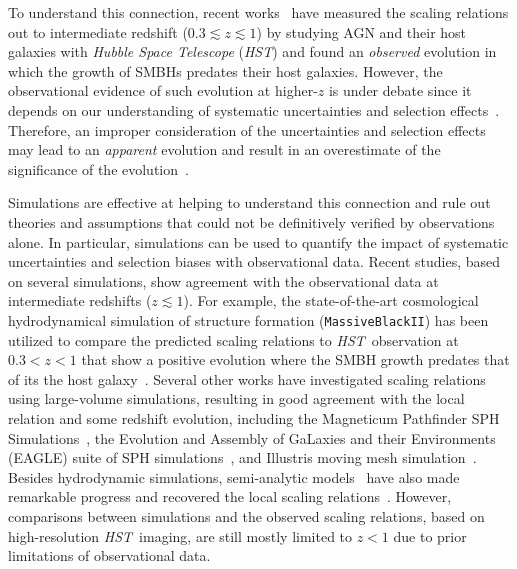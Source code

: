 \documentclass[twocolumn,trackchanges]{aastex63}
\newcommand{\hst}{{\it HST}}
\newcommand{\ding}[1]{\textcolor{red}{[{\bf Xuheng}: #1]}}
\begin{document}
To understand this connection, recent works~\citep{Park15, Tre++07, Bennert11, Woo++08} have measured the scaling relations out to intermediate redshift {($0.3\lesssim z \lesssim1$)} by studying AGN and their host galaxies with {\it Hubble Space Telescope} ({\it HST}) and found an {\it observed} evolution in which the growth of SMBHs predates their host galaxies. However, the observational evidence of such evolution at higher-$z$ is under debate since it depends on our understanding of systematic uncertainties and selection effects~\citep{Tre++07,Lauer2007}. Therefore, an improper consideration of the uncertainties and selection effects may lead to an {\it apparent} evolution and result in an overestimate of the significance of the evolution~\citep{Volonteri2011}.

Simulations are effective at helping to understand this connection and rule out theories and assumptions that could not be definitively verified by observations alone. In particular, simulations can be used to quantify the impact of systematic uncertainties and selection biases with observational data. Recent studies, based on several simulations, show agreement with the observational data at intermediate redshifts ($z\lesssim1$). For example, the state-of-the-art cosmological hydrodynamical simulation of structure formation (\texttt{MassiveBlackII}) has been utilized to compare the predicted scaling relations to \hst\ observation at $0.3<z<1$ that show a positive evolution where the SMBH growth predates that of its the host galaxy~\citep{DeG++15}. Several other works have investigated scaling relations using large-volume simulations, resulting in good agreement with the local relation and some redshift evolution, including the Magneticum Pathfinder SPH Simulations~\citep{Steinborn2015}, the Evolution and Assembly of GaLaxies and their Environments (EAGLE) suite of SPH simulations~\citep{Schaye2015}, and Illustris moving mesh simulation~\citep{Sijacki2015, Vogelsberger2014, Li2019}. Besides hydrodynamic simulations, semi-analytic models~\citep[][\ding{Hi Nicola, do you think we can refer Thomas2019 here as another semi-analytic model?}]{Menci2014, Menci2016, Thomas2019} have also made remarkable progress and recovered the local scaling relations~\citep{Kormendy13}. However, comparisons between simulations and the observed scaling relations, based on high-resolution \hst\ imaging, are still mostly limited to $z<1$ due to prior limitations of observational data.
\end{document}
